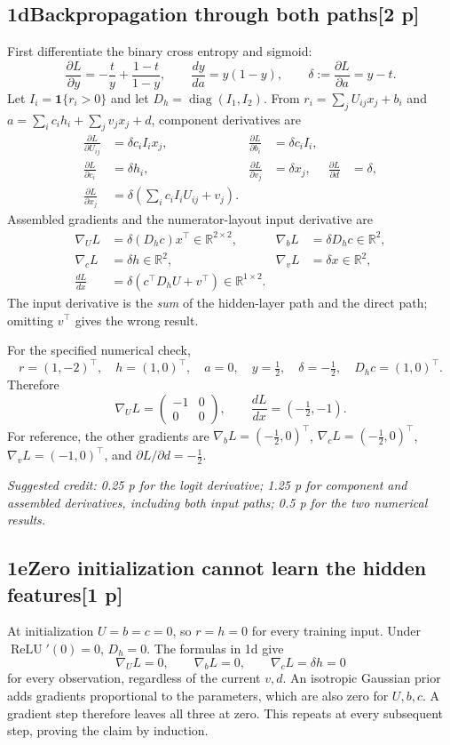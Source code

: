 \documentclass[11pt,a4paper]{article}
\newcommand{\R}{\mathbb R}
\DeclareMathOperator{\ReLU}{ReLU}
\newcommand{\solution}[3]{\Needspace{6\baselineskip}\subsection*{\color{examblue}#1\quad #2\hfill\normalsize[#3 p]}}
\newcommand{\selfcredit}[1]{\par\textit{Suggested credit: #1}\par}
\begin{document}
\solution{1d}{Backpropagation through both paths}{2}
First differentiate the binary cross entropy and sigmoid:
\[
\frac{\partial L}{\partial y}=-\frac ty+\frac{1-t}{1-y},\qquad
\frac{dy}{da}=y(1-y),\qquad
\boxed{\delta:=\frac{\partial L}{\partial a}=y-t}.
\]
Let $I_i=\mathbf1\{r_i>0\}$ and let $D_h=\operatorname{diag}(I_1,I_2)$.
From $r_i=\sum_jU_{ij}x_j+b_i$ and
$a=\sum_ic_ih_i+\sum_jv_jx_j+d$, component derivatives are
\begin{align*}
\frac{\partial L}{\partial U_{ij}}&=\delta c_i I_i x_j,&
\frac{\partial L}{\partial b_i}&=\delta c_i I_i,\\
\frac{\partial L}{\partial c_i}&=\delta h_i,&
\frac{\partial L}{\partial v_j}&=\delta x_j,&
\frac{\partial L}{\partial d}&=\delta,\\
\frac{\partial L}{\partial x_j}&=
\delta\left(\sum_ic_iI_iU_{ij}+v_j\right).
\end{align*}
Assembled gradients and the numerator-layout input derivative are
\begin{align*}
\nabla_U L&=\delta(D_hc)x^\top\in\R^{2\times2},&
\nabla_b L&=\delta D_hc\in\R^2,\\
\nabla_c L&=\delta h\in\R^2,&
\nabla_v L&=\delta x\in\R^2,\\
\boxed{\frac{dL}{dx}}&\boxed{=\delta(c^\top D_hU+v^\top)\in\R^{1\times2}}.
\end{align*}
The input derivative is the \emph{sum} of the hidden-layer path and the
direct path; omitting $v^\top$ gives the wrong result.

For the specified numerical check,
\[
r=(1,-2)^\top,\quad h=(1,0)^\top,\quad a=0,\quad
y=\tfrac12,\quad \delta=-\tfrac12,\quad D_hc=(1,0)^\top.
\]
Therefore
\[
\boxed{\nabla_U L=\begin{pmatrix}-1&0\\0&0\end{pmatrix},\qquad
\frac{dL}{dx}=(-\tfrac12,-1)}.
\]
For reference, the other gradients are
$\nabla_bL=(-\tfrac12,0)^\top$, $\nabla_cL=(-\tfrac12,0)^\top$,
$\nabla_vL=(-1,0)^\top$, and $\partial L/\partial d=-\tfrac12$.
\selfcredit{0.25 p for the logit derivative; 1.25 p for component and assembled derivatives, including both input paths; 0.5 p for the two numerical results.}

\solution{1e}{Zero initialization cannot learn the hidden features}{1}
At initialization $U=b=c=0$, so $r=h=0$ for every training input. Under
$\ReLU'(0)=0$, $D_h=0$. The formulas in 1d give
\[
\nabla_U L=0,\qquad\nabla_b L=0,\qquad\nabla_c L=\delta h=0
\]
for every observation, regardless of the current $v,d$.
An isotropic Gaussian prior adds gradients proportional to the parameters,
which are also zero for $U,b,c$. A gradient step therefore leaves all three
at zero. This repeats at every subsequent step, proving the claim by induction.
\end{document}
